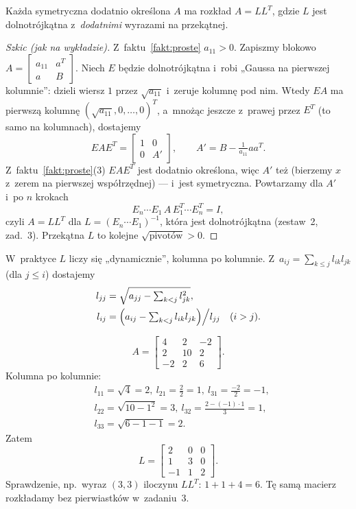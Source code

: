 \documentclass[11pt]{article}
\begin{document}
\begin{twierdzenie}\label{tw:chol}
Każda symetryczna dodatnio określona $A$ ma rozkład $A=LL^T$, gdzie
$L$ jest dolnotrójkątna z~\emph{dodatnimi} wyrazami na przekątnej.
\end{twierdzenie}

\begin{proof}[Szkic (jak na wykładzie)]
Z~faktu~\ref{fakt:proste} $a_{11}>0$. Zapiszmy blokowo
$A=\left[\begin{smallmatrix}a_{11}&a^T\\a&B\end{smallmatrix}\right]$.
Niech $E$ będzie dolnotrójkątna i~robi „Gaussa na pierwszej kolumnie”:
dzieli wiersz $1$ przez $\sqrt{a_{11}}$ i~zeruje kolumnę pod nim. Wtedy
$EA$ ma pierwszą kolumnę $(\sqrt{a_{11}},0,\ldots,0)^T$, a~mnożąc jeszcze
z~prawej przez $E^T$ (to samo na kolumnach), dostajemy
\[
EAE^T=\begin{bmatrix}1&0\\0&A'\end{bmatrix},\qquad
A'=B-\tfrac{1}{a_{11}}aa^T.
\]
Z~faktu~\ref{fakt:proste}(3) $EAE^T$ jest dodatnio określona, więc $A'$
też (bierzemy $x$ z~zerem na pierwszej współrzędnej) --- i~jest
symetryczna. Powtarzamy dla $A'$ i~po $n$ krokach
\[
E_n\cdots E_1\,A\,E_1^T\cdots E_n^T=I,
\]
czyli $A=LL^T$ dla
$L=(E_n\cdots E_1)^{-1}$, która jest dolnotrójkątna (zestaw~2, zad.~3).
Przekątna $L$ to kolejne $\sqrt{\text{pivotów}}>0$.
\end{proof}

W~praktyce $L$ liczy się „dynamicznie”, kolumna po kolumnie. Z~$a_{ij}=
\sum_{k\le j}l_{ik}l_{jk}$ (dla $j\le i$) dostajemy
\begin{align*}
l_{jj}&=\sqrt{a_{jj}-\textstyle\sum_{k<j}l_{jk}^2},\\
l_{ij}&=\Bigl(a_{ij}-\textstyle\sum_{k<j}l_{ik}l_{jk}\Bigr)\Big/l_{jj}
\quad(i>j).
\end{align*}

\begin{przyklad}
\[
A=\begin{bmatrix}4&2&-2\\2&10&2\\-2&2&6\end{bmatrix}.
\]
Kolumna po kolumnie:
\begin{align*}
&l_{11}=\sqrt4=2,\ l_{21}=\tfrac22=1,\ l_{31}=\tfrac{-2}2=-1,\\
&l_{22}=\sqrt{10-1^2}=3,\ l_{32}=\tfrac{2-(-1)\cdot1}3=1,\\
&l_{33}=\sqrt{6-1-1}=2.
\end{align*}
Zatem
\[
L=\begin{bmatrix}2&0&0\\1&3&0\\-1&1&2\end{bmatrix}.
\]
Sprawdzenie, np.\ wyraz $(3,3)$ iloczynu $LL^T$: $1+1+4=6$. Tę samą
macierz rozkładamy bez pierwiastków w~zadaniu~3.
\end{przyklad}
\end{document}
